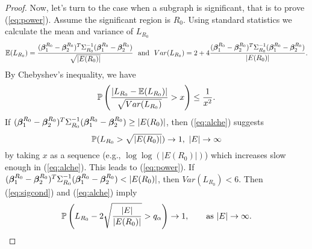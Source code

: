 \begin{proof}
Now, let's turn to the case when a subgraph is significant, that is to prove (\ref{eq:power}). Assume the significant region is $R_0$. Using standard statistics we calculate the mean and variance of $L_{R_0}$
$$
\EE(L_{R_0})={(\Bbeta_1^{R_0}-\Bbeta_2^{R_0})^T\Sigma_{R_0}^{-1}(\Bbeta_1^{R_0}-\Bbeta_2^{R_0})\over \sqrt{|E({R_0})|}} \ \ \text{and} \ \  Var(L_{R_0})=2+4{(\Bbeta_1^{R_0}-\Bbeta_2^{R_0})^T\Sigma_{R_0}^{-1}(\Bbeta_1^{R_0}-\Bbeta_2^{R_0})\over |E({R_0})|}.
$$
By Chebyshev's inequality, we have
\begin{equation}
\label{eq:alche}
\mathbb{P}\left({|L_{R_0}-\mathbb{E}(L_{R_0})|\over \sqrt{Var(L_{R_0})}}>x\right)\le {1\over x^2}.
\end{equation}
If $(\bm{\beta}_1^{R_0}-\bm{\beta}_2^{R_0})^T\Sigma_{R_0}^{-1}(\bm{\beta}_1^{R_0}-\bm{\beta}_2^{R_0})\ge |E({R_0})|$, then (\ref{eq:alche}) suggests 
$$
\mathbb{P}(L_{R_0}>\sqrt{|E(R_0)|})\to 1,\  |E|\to \infty
$$ by taking $x$ as a sequence (e.g., $\log\log(|E(R_0)|)$) which increases slow enough in (\ref{eq:alche}). This leads to (\ref{eq:power}).
If $(\Bbeta_1^{R_0}-\Bbeta_2^{R_0})^T\Sigma_{R_0}^{-1}(\Bbeta_1^{R_0}-\Bbeta_2^{R_0})<|E({R_0})|$, then $Var(L_{R_0})<6$. Then (\ref{eq:sigcond}) and (\ref{eq:alche}) imply
$$
\mathbb{P}\left(L_{R_0}-2\sqrt{|E|\over |E(R_0)|}>q_\alpha\right)\to 1, \qquad{\rm as}\  |E|\to \infty.
$$
\end{proof}


